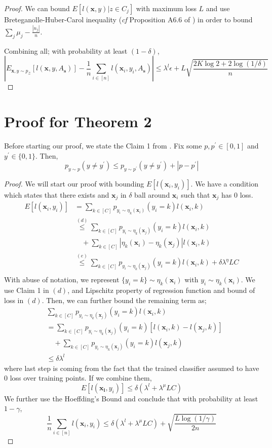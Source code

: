 \begin{proof}
We can bound $E[l(\mathbf{x},y)|z \in C_j]$ with maximum loss $L$ and use Breteganolle-Huber-Carol inequality (\emph{cf} Proposition A6.6 of \cite{wellner}) in order to bound $\sum_{j} \mu_{j} -   \frac{|n_j|}{n}$. 

Combining all; with probability at least $(1-\delta)$,
\[
\left|E_{\mathbf{x},y \sim p_\mathcal{Z}}[l(\mathbf{x},y, A_\mathbf{s})] - \frac{1}{n}\sum_{i \in [n]} l(\mathbf{x}_i,y_i,A_\mathbf{s})\right| \leq  \lambda^l \epsilon + L \sqrt{\frac{2K\log 2 + 2\log (1/\delta)}{n}}
\]
\end{proof}

\section{Proof for Theorem 2}
Before starting our proof, we state the Claim 1 from \cite{BerlindU15}. Fix some $p,p^\prime \in [0,1]$ and $y^\prime \in \{0,1\}$. Then,
\[
p_{y \sim p}(y \neq y^\prime) \leq p_{y \sim p^\prime}(y \neq y^\prime) + |p - p^\prime|
\]
\begin{proof}
We will start our proof with bounding $E[l(\mathbf{x}_i,y_i)]$. We have a condition which states that there exists and $\mathbf{x}_j$ in $\delta$ ball around $\mathbf{x}_i$ such that $\mathbf{x}_j$ has $0$ loss.
\[
\begin{aligned}
E[l(\mathbf{x}_i,y_i)] &= \sum_{k\in [C]} p_{y_i \sim \eta_k(\mathbf{x}_i)}(y_i = k) l(\mathbf{x}_i,k) \\
&\overset{(d)}{\leq} \sum_{k\in [C]} p_{y_i \sim \eta_k(\mathbf{x}_j)}(y_i = k) l(\mathbf{x}_i,k) \\ &\quad+ \sum_{k\in [C]}  |\eta_k(\mathbf{x}_i)-\eta_k(\mathbf{x}_j)| l(\mathbf{x}_i,k) \\
&\overset{(e)}{\leq} \sum_{k\in [C]} p_{y_i \sim \eta_k(\mathbf{x}_j)} (y_i = k) l(\mathbf{x}_i,k) + \delta \lambda^\eta L C\\ 
\end{aligned}
\]
With abuse of notation, we represent \mbox{$\{y_i=k\} \sim \eta_k(\mathbf{x}_i)$} with \mbox{$y_i \sim \eta_k(\mathbf{x}_i)$}. We use Claim 1 in $(d)$, and Lipschitz property of regression function and bound of loss in $(d)$. Then, we can further bound the remaining term as; 
\[
\begin{aligned}
&\sum_{k\in [C]} p_{y_i \sim \eta_k(\mathbf{x}_j)} (y_i = k) l(\mathbf{x}_i,k) \\
&= \sum_{k\in [C]} p_{y_i \sim \eta_k(\mathbf{x}_j)} (y_i = k) [l(\mathbf{x}_i,k) - l(\mathbf{x}_j,k) ] \\ &\quad+ \sum_{k\in [C]} p_{y_i \sim \eta_k(\mathbf{x}_j)} (y_i = k) l(\mathbf{x}_j,k) \\
&\leq \delta \lambda^l
\end{aligned}
\]
where last step is coming from the fact that the trained classifier assumed to have $0$ loss over training points. If we combine them,
\[
E[l(\mathbf{x_i},y_i)] \leq \delta( \lambda^l+\lambda^\mu LC)
\]
We further use the Hoeffding's Bound and conclude that with probability at least $1 - \gamma$,
\[
\frac{1}{n}\sum_{i \in [n]} l(\mathbf{x}_i,y_i) \leq \delta (\lambda^l + \lambda^\mu LC)+ 
\sqrt{\frac{L \log(1/\gamma)}{2n}}
\]
\end{proof}
